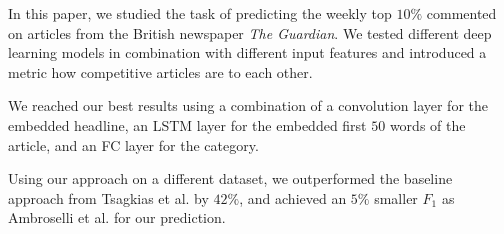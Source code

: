 In this paper, we studied the task of predicting the weekly top $10\%$ commented on articles from the British newspaper \textit{The Guardian}. We tested different deep learning models in combination with different input features and introduced a metric how competitive articles are to each other.

We reached our best results using a combination of a convolution layer for the embedded headline, an LSTM layer for the embedded first $50$ words of the article, and an FC layer for the category.

Using our approach on a different dataset, we outperformed the baseline approach from Tsagkias et al. by $42\%$, and achieved an $5\%$ smaller $F_1$ as Ambroselli et al. for our prediction.